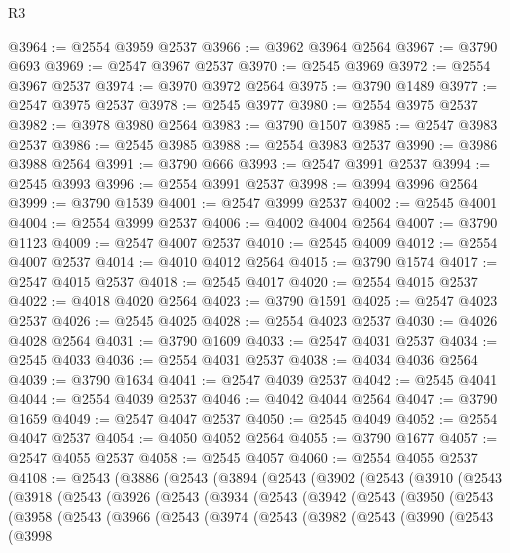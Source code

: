 \begin{lexlean}{R3}
\begin{coremodule}
@3964 := @2554 @3959 @2537
@3966 := @3962 @3964 @2564
@3967 := @3790 @693
@3969 := @2547 @3967 @2537
@3970 := @2545 @3969
@3972 := @2554 @3967 @2537
@3974 := @3970 @3972 @2564
@3975 := @3790 @1489
@3977 := @2547 @3975 @2537
@3978 := @2545 @3977
@3980 := @2554 @3975 @2537
@3982 := @3978 @3980 @2564
@3983 := @3790 @1507
@3985 := @2547 @3983 @2537
@3986 := @2545 @3985
@3988 := @2554 @3983 @2537
@3990 := @3986 @3988 @2564
@3991 := @3790 @666
@3993 := @2547 @3991 @2537
@3994 := @2545 @3993
@3996 := @2554 @3991 @2537
@3998 := @3994 @3996 @2564
@3999 := @3790 @1539
@4001 := @2547 @3999 @2537
@4002 := @2545 @4001
@4004 := @2554 @3999 @2537
@4006 := @4002 @4004 @2564
@4007 := @3790 @1123
@4009 := @2547 @4007 @2537
@4010 := @2545 @4009
@4012 := @2554 @4007 @2537
@4014 := @4010 @4012 @2564
@4015 := @3790 @1574
@4017 := @2547 @4015 @2537
@4018 := @2545 @4017
@4020 := @2554 @4015 @2537
@4022 := @4018 @4020 @2564
@4023 := @3790 @1591
@4025 := @2547 @4023 @2537
@4026 := @2545 @4025
@4028 := @2554 @4023 @2537
@4030 := @4026 @4028 @2564
@4031 := @3790 @1609
@4033 := @2547 @4031 @2537
@4034 := @2545 @4033
@4036 := @2554 @4031 @2537
@4038 := @4034 @4036 @2564
@4039 := @3790 @1634
@4041 := @2547 @4039 @2537
@4042 := @2545 @4041
@4044 := @2554 @4039 @2537
@4046 := @4042 @4044 @2564
@4047 := @3790 @1659
@4049 := @2547 @4047 @2537
@4050 := @2545 @4049
@4052 := @2554 @4047 @2537
@4054 := @4050 @4052 @2564
@4055 := @3790 @1677
@4057 := @2547 @4055 @2537
@4058 := @2545 @4057
@4060 := @2554 @4055 @2537
@4108 := @2543
    (@3886
      (@2543
        (@3894
          (@2543
            (@3902
              (@2543
                (@3910
                  (@2543
                    (@3918
                      (@2543
                        (@3926
                          (@2543
                            (@3934
                              (@2543
                                (@3942
                                  (@2543
                                    (@3950
                                      (@2543
                                        (@3958
                                          (@2543
                                            (@3966
                                              (@2543
                                                (@3974
                                                  (@2543
                                                    (@3982
                                                      (@2543
                                                        (@3990
                                                          (@2543
                                                            (@3998

\end{coremodule}
\end{lexlean}
